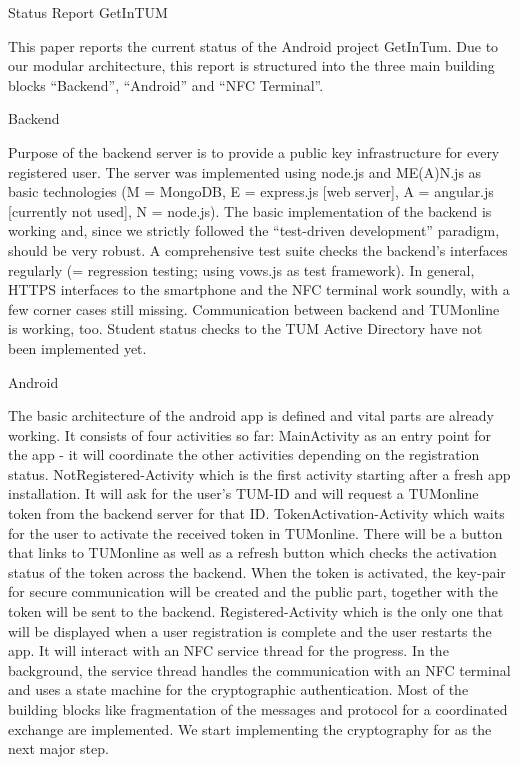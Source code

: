 Status Report GetInTUM

This paper reports the current status of the Android project GetInTum. Due to our modular architecture, this report is structured into the three main building blocks “Backend”, “Android” and “NFC Terminal”.


Backend

Purpose of the backend server is to provide a public key infrastructure for every registered user. The server was implemented using node.js and ME(A)N.js as basic technologies (M = MongoDB, E = express.js [web server], A = angular.js [currently not used], N = node.js).
The basic implementation of the backend is working and, since we strictly followed the “test-driven development” paradigm, should be very robust. A comprehensive test suite checks the backend’s interfaces regularly (= regression testing; using vows.js as test framework).
In general, HTTPS interfaces to the smartphone and the NFC terminal work soundly, with a few corner cases still missing. Communication between backend and TUMonline is working, too. Student status checks to the TUM Active Directory have not been implemented yet.


Android

The basic architecture of the android app is defined and vital parts are already working.
It consists of four activities so far:
MainActivity as an entry point for the app - it will coordinate the other activities depending on the registration status.
NotRegistered-Activity which is the first activity starting after a fresh app installation. It will ask for the user’s TUM-ID and will request a TUMonline token from the backend server for that ID.
TokenActivation-Activity which waits for the user to activate the received token in TUMonline. There will be a button that links to TUMonline as well as a refresh button which checks the activation status of the token across the backend. When the token is activated, the key-pair for secure communication will be created and the public part, together with the token will be sent to the backend.
Registered-Activity which is the only one that will be displayed when a user registration is complete and the user restarts the app. It will interact with an NFC service thread for the progress.
In the background, the service thread handles the communication with an NFC terminal and uses a state machine for the cryptographic authentication. Most of the building blocks like fragmentation of the messages and protocol for a coordinated exchange are implemented. We start implementing the cryptography for as the next major step.


